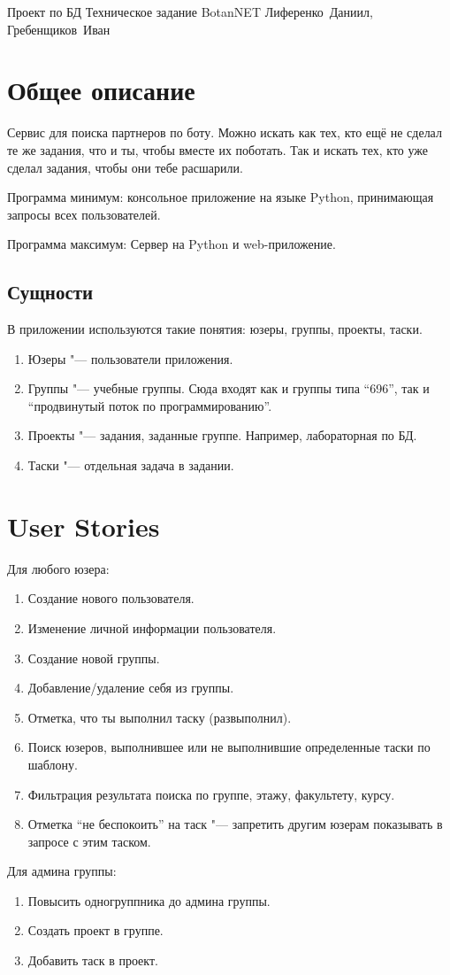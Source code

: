 \documentclass[12pt,a4paper,notitlepage]{article}
\begin{document}
\BigHeader
{Проект по БД}
{Техническое задание BotanNET}
{Лиференко~Даниил, Гребенщиков~Иван}

\section{Общее описание}

Сервис для поиска партнеров по боту.
Можно искать как тех, кто ещё не сделал те же задания, что и ты, чтобы вместе их поботать.
Так и искать тех, кто уже сделал задания, чтобы они тебе расшарили.

Программа минимум: консольное приложение на языке Python, принимающая запросы всех пользователей.

Программа максимум: Сервер на Python и web-приложение.

\subsection{Сущности}
В приложении используются такие понятия: юзеры, группы, проекты, таски.

\begin{enumerate}
\item Юзеры "--- пользователи приложения.
\item Группы "--- учебные группы. Сюда входят как и группы типа ``696'', так и ``продвинутый поток по программированию''.
\item Проекты "--- задания, заданные группе. Например, лабораторная по БД.
\item Таски "--- отдельная задача в задании.
\end{enumerate}

\section{User Stories}
Для любого юзера:
\begin{enumerate}
\item Создание нового пользователя.
\item Изменение личной информации пользователя.
\item Создание новой группы.
\item Добавление/удаление себя из группы.
\item Отметка, что ты выполнил таску (развыполнил).
\item Поиск юзеров, выполнившее или не выполнившие определенные таски по шаблону.
\item Фильтрация результата поиска по группе, этажу, факультету, курсу.
\item Отметка ``не беспокоить'' на таск "--- запретить другим юзерам показывать в запросе с этим таском.
\end{enumerate}
\newpage
Для админа группы:
\begin{enumerate}
\item Повысить одногруппника до админа группы.
\item Создать проект в группе.
\item Добавить таск в проект.
\end{enumerate}
\end{document}
